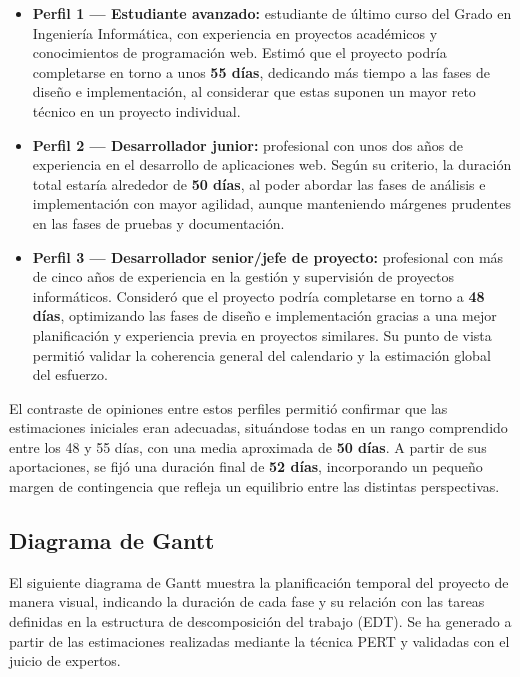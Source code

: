 \begin{itemize}
    \item \textbf{Perfil 1 — Estudiante avanzado:} estudiante de último curso del Grado en Ingeniería Informática, con experiencia en proyectos académicos y conocimientos de programación web. 
    Estimó que el proyecto podría completarse en torno a unos \textbf{55 días}, dedicando más tiempo a las fases de diseño e implementación, al considerar que estas suponen un mayor reto técnico en un proyecto individual.

    \item \textbf{Perfil 2 — Desarrollador junior:} profesional con unos dos años de experiencia en el desarrollo de aplicaciones web. 
    Según su criterio, la duración total estaría alrededor de \textbf{50 días}, al poder abordar las fases de análisis e implementación con mayor agilidad, aunque manteniendo márgenes prudentes en las fases de pruebas y documentación.

    \item \textbf{Perfil 3 — Desarrollador senior/jefe de proyecto:} profesional con más de cinco años de experiencia en la gestión y supervisión de proyectos informáticos. 
    Consideró que el proyecto podría completarse en torno a \textbf{48 días}, optimizando las fases de diseño e implementación gracias a una mejor planificación y experiencia previa en proyectos similares. Su punto de vista permitió validar la coherencia general del calendario y la estimación global del esfuerzo.
\end{itemize}
\clearpage
El contraste de opiniones entre estos perfiles permitió confirmar que las estimaciones iniciales eran adecuadas, situándose todas en un rango comprendido entre los 48 y 55 días, con una media aproximada de \textbf{50 días}. 
A partir de sus aportaciones, se fijó una duración final de \textbf{52 días}, incorporando un pequeño margen de contingencia que refleja un equilibrio entre las distintas perspectivas.

\subsection{Diagrama de Gantt}

El siguiente diagrama de Gantt muestra la planificación temporal del proyecto de manera visual,
indicando la duración de cada fase y su relación con las tareas definidas en la estructura de descomposición del trabajo (EDT).
Se ha generado a partir de las estimaciones realizadas mediante la técnica PERT y validadas con el juicio de expertos.

